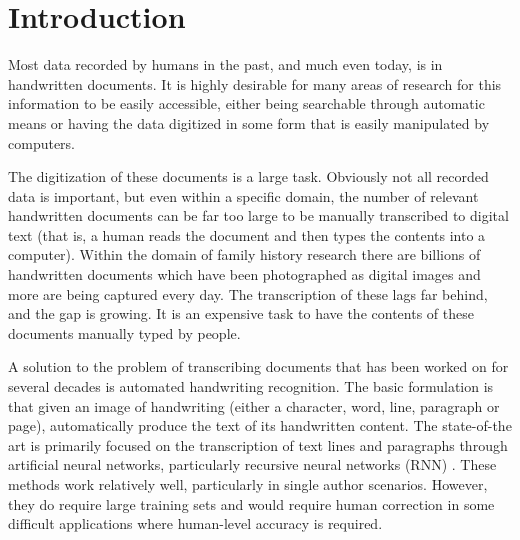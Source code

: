 \documentclass[ms,electronic,twosidetoc,letterpaper,chaptercenter,parttop,lol,lof,lot]{byumsphd}
\title{\Title}
\author{\Author}
\begin{document}
\maketitle
{}

\chapter{Introduction}

Most data recorded by humans in the past, and much even today, is in handwritten documents. 
It is highly desirable for many areas of research for this information to be easily accessible, either being searchable through automatic means or having the data digitized in some form that is easily manipulated by computers.

The digitization of these documents is a large task. Obviously not all recorded data is important, but even within a specific domain, the number of relevant handwritten documents can be far too large to be manually transcribed to digital text (that is, a human reads the document and then types the contents into a computer). Within the domain of family history research there are billions of handwritten documents which have been photographed as digital images and more are being captured every day.
The transcription of these lags far behind, and the gap is growing. It is an expensive task to have the contents of these documents manually typed by people.

A solution to the problem of transcribing documents that has been worked on for several decades is automated handwriting recognition. The basic formulation is that given an image of handwriting (either a character, word, line, paragraph or page), automatically produce the text of its handwritten content. The state-of-the art is primarily focused on the transcription of text lines and paragraphs through artificial neural networks, particularly recursive neural networks (RNN) \cite{icfhrComp2016, wigington2017, icdarComp2017}. These methods work relatively well, particularly in single author scenarios. However, they do require large training sets and would require human correction in some difficult applications where human-level accuracy is required.
\end{document}
